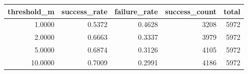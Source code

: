 \begin{tabular}{rrrrr}
\toprule
threshold_m & success_rate & failure_rate & success_count & total \\
\midrule
1.0000 & 0.5372 & 0.4628 & 3208 & 5972 \\
2.0000 & 0.6663 & 0.3337 & 3979 & 5972 \\
5.0000 & 0.6874 & 0.3126 & 4105 & 5972 \\
10.0000 & 0.7009 & 0.2991 & 4186 & 5972 \\
\bottomrule
\end{tabular}
